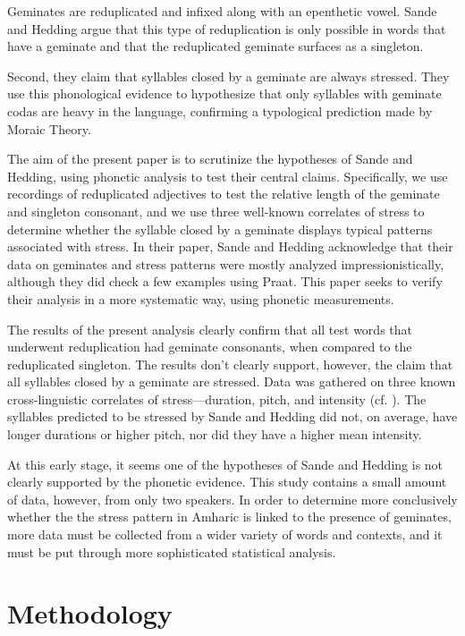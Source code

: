 \documentclass[12pt]{article}
\begin{document}
Geminates are reduplicated and infixed along with an epenthetic vowel. Sande and Hedding argue that this type of reduplication is only possible in words that have a geminate and that the reduplicated geminate surfaces as a singleton. 

Second, they claim that syllables closed by a geminate are always stressed. They use this phonological evidence to hypothesize that only syllables with geminate codas are heavy in the language, confirming a typological prediction made by Moraic Theory.

The aim of the present paper is to scrutinize the hypotheses of Sande and Hedding, using phonetic analysis to test their central claims. Specifically, we use recordings of reduplicated adjectives to test the relative length of the geminate and singleton consonant, and we use three well-known correlates of stress to determine whether the syllable closed by a geminate displays typical patterns associated with stress. In their paper, Sande and Hedding acknowledge that their data on geminates and stress patterns were mostly analyzed impressionistically, although they did check a few examples using Praat. This paper seeks to verify their analysis in a more systematic way, using phonetic measurements. 

The results of the present analysis clearly confirm that all test words that underwent reduplication had geminate consonants, when compared to the reduplicated singleton. The results don't clearly support, however, the claim that all syllables closed by a geminate are stressed. Data was gathered on three known cross-linguistic correlates of stress---duration, pitch, and intensity (cf. \cite{fox2002}). The syllables predicted to be stressed by Sande and Hedding did not, on average, have longer durations or higher pitch, nor did they have a higher mean intensity. 

At this early stage, it seems one of the hypotheses of Sande and Hedding is not clearly supported by the phonetic evidence. This study contains a small amount of data, however, from only two speakers. In order to determine more conclusively whether the the stress pattern in Amharic is linked to the presence of geminates, more data must be collected from a wider variety of words and contexts, and it must be put through more sophisticated statistical analysis.

\section{Methodology}
\end{document}
